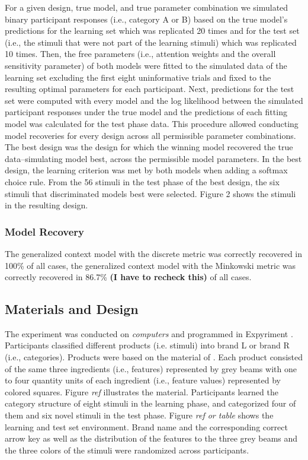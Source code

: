 \documentclass[a4paper,man,natbib]{apa6}
\newcommand{\cmmnt}[1]{\ignorespaces}
\begin{document}
For a given design, true model, and true parameter combination we simulated binary participant responses (i.e., category A or B) based on the true model's predictions for the learning set which was replicated 20 times and for the test set (i.e., the stimuli that were not part of the learning stimuli) which was replicated 10 times. Then, the free parameters (i.e., attention weights and the overall sensitivity parameter) of both models were fitted to the simulated data of the learning set excluding the first eight uninformative trials\cmmnt{ where models have not encountered enough instances to render informative predictions} and fixed to the resulting optimal parameters for each participant. Next, predictions for the test set were computed with every model and the log likelihood between the simulated participant responses under the true model and the predictions of each fitting model was calculated for the test phase data. This procedure allowed conducting model recoveries for every design across all permissible parameter combinations. The best design was the design for which the winning model recovered the true data--simulating model best, across the permissible model parameters. In the best design, the learning criterion was met by both models when adding a softmax choice rule. From the 56 stimuli in the test phase of the best design, the six stimuli that discriminated models best were selected. Figure 2 shows the stimuli in the resulting design.

\subsubsection{Model Recovery}
The generalized context model with the discrete metric was correctly recovered in 100\% of all cases, the generalized context model with the Minkowski metric was correctly recovered in 86.7\% \textbf{(I have to recheck this)} of all cases. 

\subsection{Materials and Design}
The experiment was conducted on \textit{computers} and programmed in Expyriment \citep{krause2014expyriment}.  Participants classified different products (i.e. stimuli) into brand L or brand R (i.e., categories). Products were based on the material of \cite{albrechtxxxunstacking}. Each product consisted of the same three ingredients (i.e., features) represented by grey beams with one to four quantity units of each ingredient (i.e., feature values) represented by colored squares. Figure \textit{ref} illustrates the material. Participants learned the category structure of eight stimuli in the learning phase, and categorized four of them and six novel stimuli in the test phase. Figure \textit{ref or table} shows the learning and test set environment. Brand name and the corresponding correct arrow key as well as the distribution of the features to the three grey beams and the three colors of the stimuli were randomized across participants.
\end{document}
